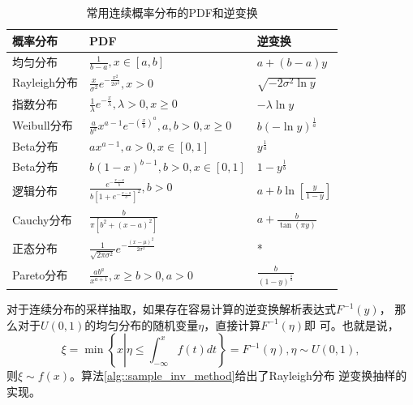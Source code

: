 \renewcommand\arraystretch{1.5}
\begin{table}[!ht]
  \centering
  \caption{常用连续概率分布的PDF和逆变换}
  \label{table::pdf_inv}
\begin{tabular}{|l|l|l|}
  \hline
  概率分布&PDF&逆变换\\
  \hline
  \small 均匀分布&$\frac{1}{b - a}, x \in [a, b]$&$a + (b - a)y$\\
  \hline
  \small Rayleigh分布&$\frac{x}{\sigma^2}e^{-\frac{x^2}{2\sigma^2}}, x > 0$
  &$\sqrt{-2\sigma^2\ln y}$\\
  \hline
  \small 指数分布&$\frac{1}{\lambda} e^{-\frac{x}{\lambda}}, \lambda > 0, x \geq 0$
  &$-\lambda\ln y$\\
  \hline
  \small Weibull分布&$\frac{a}{b^a}x^{a - 1} e^{-\left(\frac{x}{b}\right)^a},
  a, b > 0, x \geq 0$
  &$b\left(-\ln y\right)^{\frac{1}{a}}$\\
  \hline
  \small Beta分布&$ax^{a - 1}, a > 0, x \in [0, 1]$&$y^{\frac{1}{a}}$\\
  \hline
  \small Beta分布&$b(1 - x)^{b - 1}, b > 0, x \in [0, 1]$&$1 - y^{\frac{1}{b}}$\\
  \hline
  \small 逻辑分布&$\frac{e^{-\frac{x - a}{b}}}{b\left[1 + e^{-\frac{x - a}{b}}\right]^2}, b > 0$&$a + b \ln\left[\frac{y}{1 - y}\right]$\\
  \hline
  \small Cauchy分布&$\frac{b}{\pi\left[b^2 + (x - a)^2\right]}$
  &$a + \frac{b}{\tan(\pi y)}$\\
  \hline
  \small 正态分布&$\frac{1}{\sqrt{2\pi\sigma^2}}e^{-\frac{(x - \mu)^2}{2\sigma^2}}$&*\\
  \hline
  \small Pareto分布&$\frac{ab^a}{x^{a + 1}}, x \geq b > 0, a > 0$&$\frac{b}{(1 - y)^{\frac{1}{a}}}$\\
  \hline
\end{tabular}
\end{table}
\renewcommand\arraystretch{1}

对于连续分布的采样抽取，如果存在容易计算的逆变换解析表达式$F^{-1}(y)$，
那么对于$U(0, 1)$的均匀分布的随机变量$\eta$，直接计算$F^{-1}(\eta)$即
可。也就是说，
\begin{equation}
  \xi = \min\left\{x \left|\eta \leq \int_{-\infty}^x f(t)
  dt\right.\right\} = F^{-1}(\eta), \eta \sim U(0, 1),
  \label{eq::inv}
\end{equation}
则$\xi \sim f(x)$。算法\ref{alg::sample_inv_method}给出了Rayleigh分布
逆变换抽样的实现。

